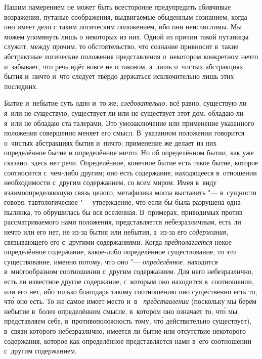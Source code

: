 Нашим намерением не может быть всесторонне предупредить сбивчивые возражения,
путаные соображения, выдвигаемые обыденным сознанием, когда оно имеет дело с
таким логическим положением, ибо они неисчислимы. Мы можем упомянуть лишь о
некоторых из них. Одной из причин такой путаницы служит, между прочим, то
обстоятельство, что сознание привносит в~такие абстрактные логические положения
представления о~некотором конкретном нечто и~забывает, что речь идёт вовсе не о
таковом, а~лишь о~чистых абстракциях бытия и~ничто и~что следует твёрдо
держаться исключительно лишь этих последних.

Бытие и~небытие суть одно и~то же; {\em следовательно,} всё равно, существую ли
я~или не существую, существует ли или не существует этот дом, обладаю ли я~или
не обладаю ста талерами. Это умозаключение или применение указанного положения
совершенно меняет его смысл. В~указанном положении говорится о~чистых
абстракциях бытия и~ничто; применение же делает из них определённое бытие и
определённое ничто. Но об определённом бытии, как уже сказано, здесь нет речи.
Определённое, конечное бытие есть такое бытие, которое соотносится с~чем-либо
другим; оно есть содержание, находящееся в~отношении необходимости с~другим
содержанием, со всем миром. Имея в~виду взаимоопределяющую связь целого,
метафизика могла выставить "--- в~сущности говоря, тавтологическое "---
утверждение, что если бы была разрушена одна пылинка, то обрушилась бы вся
вселенная. В~примерах, приводимых против рассматриваемого нами положения,
представляется небезразличным, есть ли нечто или его нет, не из-за бытия или
небытия, а~из-за его {\em содержания,} связывающего его с~другими содержаниями.
Когда {\em предполагается} некое определённое содержание, какое-либо
определённое существование, то это существование, именно потому, что оно "---
{\em определённое,} находится в~многообразном соотношении с~другим содержанием.
Для него небезразлично, есть ли известное другое содержание, с~которым оно
находится в~соотношении, или его нет, ибо только благодаря такому соотношению
оно существенно есть то, чт\'{о} оно есть. То же самое имеет место и~в~{\em
представлении} (поскольку мы берём небытие в~более определённом смысле,
в~котором оно означает то, чт\'{о} мы представляем себе, в~противоположность
тому, чт\'{о} действительно существует), в~связи которого небезразлично,
имеется ли бытие или отсутствие некоторого содержания, которое как определённое
представляется нами в~его соотношении с~другим содержанием. \label{bkm:bm85a}

